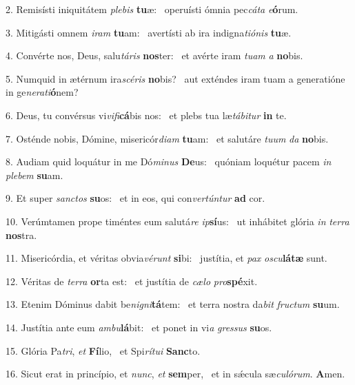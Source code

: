 2. Remisísti iniquitátem \textit{ple}\textit{bis} \textbf{tu}æ: \ast\  operuísti ómnia pec\textit{cá}\textit{ta} \textit{e}\textbf{ó}rum.\

3. Mitigásti omnem \textit{i}\textit{ram} \textbf{tu}am: \ast\  avertísti ab ira indigna\textit{ti}\textit{ó}\textit{nis} \textbf{tu}æ.\

4. Convérte nos, Deus, salu\textit{tá}\textit{ris} \textbf{nos}ter: \ast\  et avérte iram \textit{tu}\textit{am} \textit{a} \textbf{no}bis.\

5. Numquid in ætérnum ira\textit{scé}\textit{ris} \textbf{no}bis? \ast\  aut exténdes iram tuam a generatióne in ge\textit{ne}\textit{ra}\textit{ti}\textbf{ó}nem?\

6. Deus, tu convérsus vi\textit{vi}\textit{fi}\textbf{cá}bis nos: \ast\  et plebs tua læ\textit{tá}\textit{bi}\textit{tur} \textbf{in} te.\

7. Osténde nobis, Dómine, misericór\textit{di}\textit{am} \textbf{tu}am: \ast\  et salutáre \textit{tu}\textit{um} \textit{da} \textbf{no}bis.\

8. Audiam quid loquátur in me Dó\textit{mi}\textit{nus} \textbf{De}us: \ast\  quóniam loquétur pacem \textit{in} \textit{ple}\textit{bem} \textbf{su}am.\

9. Et super \textit{sanc}\textit{tos} \textbf{su}os: \ast\  et in eos, qui con\textit{ver}\textit{tún}\textit{tur} \textbf{ad} cor.\

10. Verúmtamen prope timéntes eum salutá\textit{re} \textit{ip}\textbf{sí}us: \ast\  ut inhábitet glória \textit{in} \textit{ter}\textit{ra} \textbf{nos}tra.\

11. Misericórdia, et véritas obvia\textit{vé}\textit{runt} \textbf{si}bi: \ast\  justítia, et \textit{pax} \textit{os}\textit{cu}\textbf{lá}\textbf{tæ} sunt.\

12. Véritas de \textit{ter}\textit{ra} \textbf{or}ta est: \ast\  et justítia de \textit{cæ}\textit{lo} \textit{pro}\textbf{spé}xit.\

13. Etenim Dóminus dabit be\textit{ni}\textit{gni}\textbf{tá}tem: \ast\  et terra nostra da\textit{bit} \textit{fruc}\textit{tum} \textbf{su}um.\

14. Justítia ante eum \textit{am}\textit{bu}\textbf{lá}bit: \ast\  et ponet in vi\textit{a} \textit{gres}\textit{sus} \textbf{su}os.\

15. Glória Pa\textit{tri}, \textit{et} \textbf{Fí}lio, \ast\  et Spi\textit{rí}\textit{tu}\textit{i} \textbf{Sanc}to.\

16. Sicut erat in princípio, et \textit{nunc}, \textit{et} \textbf{sem}per, \ast\  et in sǽcula sæ\textit{cu}\textit{ló}\textit{rum}. \textbf{A}men.\

